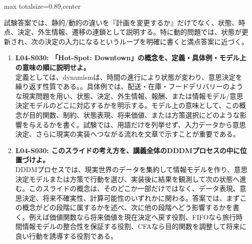 \begin{minipage}[t]{0.58\textwidth}
\begin{adjustbox}{max totalsize={\textwidth}{0.89\textheight},center}
\begin{minipage}{\textwidth}
試験答案では、静的/動的の違いを『計画を変更するか』だけでなく、状態、時点、決定、外生情報、遷移の連鎖として説明する。特に動的問題では、状態が更新され、次の決定の入力になるというループを明確に書くと満点答案に近づく。\par{}\begin{enumerate}\item \textbf{L04-S030: 「Hot-Spot: Downtown」の概念を、定義・具体例・モデル上の意味の順に説明せよ。}\\定義としては、dynamismは、時間の進行により状態が変わり、意思決定を繰り返す性質である。。具体例では、配送・在庫・フードデリバリーのような現実問題を用い、状態、決定、外生情報、報酬、または情報モデル/意思決定モデルのどこに対応するかを明示する。モデル上の意味として、この概念が目的関数、制約、状態表現、将来価値、または方策選択にどのような影響を与えるかを書く。試験では、用語だけを列挙せず、入力データから意思決定、さらに現実の実装へつながる流れを文章で示すことが重要である。\item \textbf{L04-S030: このスライドの考え方を、講義全体のDDDMプロセスの中に位置づけよ。}\\DDDMプロセスでは、現実世界のデータを集約して情報モデルを作り、意思決定モデルまたは方策で行動を選び、実装後に結果を観測して次の状態へ進む。このスライドの概念は、そのどこか一部だけではなく、データ表現、意思決定、将来不確実性、計算可能性のいずれかに関わる。答案では、まずこの概念がどの段階に属するかを述べ、次に他の段階へどう影響するかを書く。例えば価値関数なら将来価値を現在決定へ戻す役割、FIFOなら旅行時間情報モデルの整合性を保証する役割、CFAなら目的関数を調整して将来に良い行動を誘導する役割である。\end{enumerate}
\end{minipage}
\end{adjustbox}
\end{minipage}


